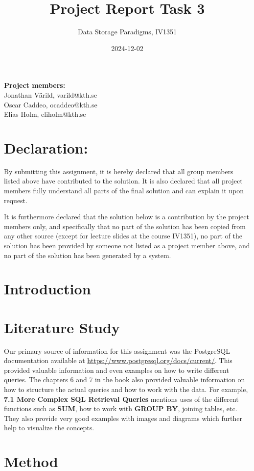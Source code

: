 \documentclass[a4paper]{scrartcl}
\title{Project Report Task 3}
\subtitle{Data Storage Paradigms, IV1351}
\author{}
\date{2024-12-02}
\begin{document}
\maketitle
\noindent\textbf{Project members:} \\ \hfill
Jonathan Värild, varild@kth.se \\ \hfill
Oscar Caddeo, ocaddeo@kth.se \\ \hfill
Elias Holm, eliholm@kth.se \\ \hfill

\section*{Declaration:}

By submitting this assignment, it is hereby declared that all group members listed above have contributed to the solution. It is also declared that all project members fully understand all parts of the final solution and can explain it upon request.

It is furthermore declared that the solution below is a contribution by the project members only, and specifically that no part of the solution has been copied from any other source (except for lecture slides at the course IV1351), no part of the solution has been provided by someone not listed as a project member above, and no part of the solution has been generated by a system.

\section{Introduction}


\section{Literature Study}
Our primary source of information for this assignment was the PostgreSQL documentation available at \url{https://www.postgresql.org/docs/current/}. This provided valuable information and even examples on how to write different queries. The chapters 6 and 7 in the book also provided valuable information on how to structure the actual queries and how to work with the data. For example, \textbf{7.1 More Complex SQL Retrieval Queries} mentions uses of the different functions such as \textbf{SUM}, how to work with \textbf{GROUP BY}, joining tables, etc. They also provide very good examples with images and diagrams which further help to visualize the concepts.

\section{Method}
\end{document}
